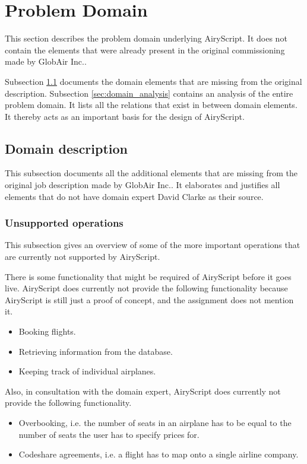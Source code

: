 \section{Problem Domain}
\label{sec:domain}

This section describes the problem domain underlying AiryScript. It does not
contain the elements that were already present in the original commissioning
made by GlobAir Inc..

Subsection \ref{sec:domain_description} documents the domain elements that are
missing from the original description.
%
Subsection \ref{sec:domain_analysis} contains an analysis of the entire problem
domain. It lists all the relations that exist in between domain elements.
It thereby acts as an important basis for the design of AiryScript.

\subsection{Domain description}
\label{sec:domain_description}
This subsection documents all the additional elements that are missing from the
original job description made by GlobAir Inc.. It elaborates and justifies all
elements that do not have domain expert David Clarke as their source.


\subsubsection{Unsupported operations}
\label{sec:unsupported}
This subsection gives an overview of some of the more important operations that
are currently not supported by AiryScript.

There is some functionality that might be required of AiryScript before it goes
live. AiryScript does currently not provide the following functionality because
AiryScript is still just a proof of concept, and the assignment does not mention
it.
\begin{itemize}
  \item Booking flights.
  \item Retrieving information from the database.
  \item Keeping track of individual airplanes.
\end{itemize}

Also, in consultation with the domain expert, AiryScript does currently not
provide the following functionality.
\begin{itemize}
  \item Overbooking, i.e. the number of seats in an airplane has to be equal to
    the number of seats the user has to specify prices for.
  \item Codeshare agreements, i.e. a flight has to map onto a single airline
    company.
\end{itemize}


